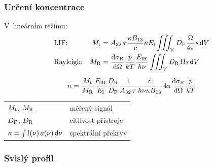 \documentclass{beamer}
\newcommand\en{E}
\renewcommand\enlaser{\en_\text{l}}
\begin{document}
\begin{frame}
	\frametitle{Určení koncentrace}
	V~lineárním režimu:
	\begin{align*}
		&\text{LIF:} &
		\lifsignal &= A_{32}\,\lifetime \frac{\specoverlap B_{13}}{\lightspeed}
		\dens \enlaser \iiint_\vol \lifsens \frac{\Omega}{4\pi} s \dd{\vol} \\
		&\text{Rayleigh:} & \rayleighsignal &= \rayleighxsec \frac{p}{kT}
		\frac{\enrayleigh}{\planck\freq}
		\iiint_\vol \rayleighsens\,\Omega s \dd{\vol}
	\end{align*}
	\begin{block}{}
		\begin{equation*}
			\label{eq:label}
			\dens = \frac{\lifsignal}{\rayleighsignal}
			\frac{\enrayleigh}{\enlaser}\frac{\rayleighsens}{\lifsens}
			\frac{1}{A_{32}\,\tau}
			\frac{\lightspeed}{\planck\freq\specoverlap B_{13}}
			\, 4\pi \rayleighxsec \frac{p}{kT}
		\end{equation*}
	\end{block}
	\medskip
	\begin{tabular}{l l}
		$M_\text{t}$, $M_\text{R}$ & měřený signál \\
		$D_\text{F}$, $D_\text{R}$ & citlivost přístroje \\
		$\kappa = \int l(\nu)\,a(\nu) \,\mathsf{d}\nu$
		& spektrální překryv
	\end{tabular}
\end{frame}

\newcommand\flamey{h}

\begin{frame}
	\frametitle{Svislý profil}
	\begin{columns}[c]
		\begin{column}{0.48\textwidth}
		\end{column}
		\begin{column}{0.48\textwidth}
		\end{column}
	\end{columns}
\end{frame}
\end{document}
